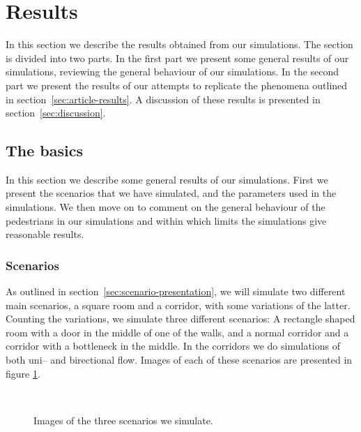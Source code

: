 \section{Results}
\label{sec:results}
In this section we describe the results obtained from our simulations.  The 
section is divided into two parts. In the first part we present some general 
results of our simulations, reviewing the general behaviour of our 
simulations. In the second part we present the results of our attempts to 
replicate the phenomena outlined in section~\ref{sec:article-results}. A 
discussion of these results is presented in section~\ref{sec:discussion}.

\subsection{The basics}
In this section we describe some general results of our simulations. 
First we present the scenarios that we have simulated, and the parameters 
used in the simulations. We then move on to comment on the general behaviour 
of the pedestrians in our simulations and within which limits the simulations 
give reasonable results.

\subsubsection{Scenarios}
As outlined in section~\ref{sec:scenario-presentation}, we will simulate two 
different main scenarios, a square room and a corridor, with some variations 
of the latter. Counting the variations, we simulate three different scenarios: 
A rectangle shaped room with a door in the middle of one of the walls, and a 
normal corridor and a corridor with a bottleneck in the middle.  In the 
corridors we do simulations of both uni-- and birectional flow. Images of each 
of these scenarios are presented in figure \ref{fig:simulated-cases}.

\begin{figure}[h]
    \centering
    \\
    \subfloat[Corridor.]{
        \resizebox{0.45\textwidth}{!}{}
        \label{subfig:image-corridor}       
    }
    \subfloat[Bottleneck.]{
        \resizebox{0.45\textwidth}{!}{}
        \label{subfig:image-bottleneck}
    }
    \caption{Images of the three scenarios we simulate.}
    \label{fig:simulated-cases}
\end{figure}

